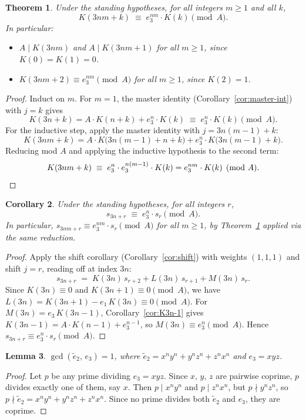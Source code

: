 \documentclass[12pt]{article}
\newtheorem{theorem}{Theorem}[section]
\newtheorem{lemma}[theorem]{Lemma}
\newtheorem{corollary}[theorem]{Corollary}
\theoremstyle{definition}
\begin{document}
	\begin{theorem}
		\label{thm:K-mod-A}
		Under the standing hypotheses, for all integers $m \geq 1$ and all $k$,
		\[
		K(3nm + k) \;\equiv\; e_3^{nm} \cdot K(k) \pmod{A}.
		\]
		In particular:
		\begin{itemize}
			\item $A \mid K(3nm)$ and $A \mid K(3nm+1)$ for all $m \geq 1$, since $K(0) = K(1) = 0$.
			\item $K(3nm+2) \equiv e_3^{nm} \pmod{A}$ for all $m \geq 1$, since $K(2) = 1$.
		\end{itemize}
	\end{theorem}
	\begin{proof}
		Induct on $m$.  For $m=1$, the master identity
		(Corollary~\ref{cor:master-int}) with $j = k$ gives
		\[
		K(3n+k) = A \cdot K(n+k) + e_3^n \cdot K(k) \;\equiv\; e_3^n \cdot K(k) \pmod{A}.
		\]
		For the inductive step, apply the master identity with $j = 3n(m-1)+k$:
		\[
		K(3nm+k) = A \cdot K\bigl(3n(m-1)+n+k\bigr) + e_3^n \cdot K\bigl(3n(m-1)+k\bigr).
		\]
		Reducing mod $A$ and applying the inductive hypothesis to the second term:
		\[
		K(3nm+k) \;\equiv\; e_3^n \cdot e_3^{n(m-1)} \cdot K(k) = e_3^{nm} \cdot K(k) \pmod{A}. \qedhere
		\]
	\end{proof}
	
	\begin{corollary}
		\label{cor:s3nr-mod-A}
		Under the standing hypotheses, for all integers $r$,
		\[
		s_{3n+r} \;\equiv\; e_3^n \cdot s_r \pmod{A}.
		\]
		In particular, $s_{3nm+r} \equiv e_3^{nm} \cdot s_r \pmod{A}$ for all $m \geq 1$,
		by Theorem~\ref{thm:K-mod-A} applied via the same reduction.
	\end{corollary}
	\begin{proof}
		Apply the shift corollary (Corollary~\ref{cor:shift}) with weights $(1,1,1)$
		and shift $j = r$, reading off at index $3n$:
		\[
		s_{3n+r} \;=\; K(3n)\,s_{r+2} + L(3n)\,s_{r+1} + M(3n)\,s_r.
		\]
		Since $K(3n) \equiv 0$ and $K(3n+1) \equiv 0 \pmod{A}$,
		we have $L(3n) = K(3n+1) - e_1\,K(3n) \equiv 0 \pmod{A}$.
		For $M(3n) = e_3\,K(3n-1)$, Corollary~\ref{cor:K3n-1} gives
		$K(3n-1) = A \cdot K(n-1) + e_3^{n-1}$, so $M(3n) \equiv e_3^n \pmod{A}$.
		Hence $s_{3n+r} \equiv e_3^n \cdot s_r \pmod{A}$.
	\end{proof}
	
	\begin{lemma}
		\label{lem:etilde-coprime}
		$\gcd(\tilde{e}_2,\, e_3) = 1$, where
		$\tilde{e}_2 = x^ny^n + y^nz^n + z^nx^n$ and $e_3 = xyz$.
	\end{lemma}
	\begin{proof}
		Let $p$ be any prime dividing $e_3 = xyz$.  Since $x$, $y$, $z$ are
		pairwise coprime, $p$ divides exactly one of them, say $x$.  Then
		$p \mid x^ny^n$ and $p \mid z^nx^n$, but $p \nmid y^nz^n$, so
		$p \nmid \tilde{e}_2 = x^ny^n + y^nz^n + z^nx^n$.
		Since no prime divides both $\tilde{e}_2$ and $e_3$, they are coprime.
	\end{proof}
	
\end{document}
